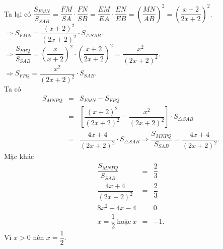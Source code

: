 \begin{ex}
{		Ta lại có  $\dfrac{S_{FMN}}{S_{SAB}}=\dfrac{FM}{S A} \cdot \dfrac{FN}{SB}=\dfrac{EM}{EA} \cdot \dfrac{EN}{EB}=\left(\dfrac{M N}{A B}\right)^{2}=\left(\dfrac{x+2}{2 x+2}\right)^{2}$.\\
		$\Rightarrow S_{FMN}=\dfrac{(x+2)^{2}}{(2 x+2)^{2}} \cdot S_{\triangle SAB}$.  \\
		$ \Rightarrow \dfrac{S_{FPQ}}{S_{SAB}}=\left(\dfrac{x}{x+2}\right)^{2}\cdot\left(\dfrac{x+2}{2x+2}\right)^{2}=\dfrac{x^{2}}{(2  x+2)^{2}}$.\\
		 $\Rightarrow S_{FPQ}=\dfrac{x^2}{(2x+2)^{2}} \cdot S_{SAB}$.\\
		Ta  có
		\begin{eqnarray*}
			S_{M N P  Q}&=&S_{FMN}-S_{FPQ}\\
			&=&\left[\dfrac{(x+2)^2}{(2x+2)^{2}}-\dfrac{x^2}{(2x+2)^{2}}\right] \cdot S_{\triangle SAB}\\ 
			&=&\dfrac{4x+4}{(2x+2)^2} \cdot  S_{\triangle SAB} \Rightarrow \dfrac{S_{MNPQ}}{S_{SAB}}=\dfrac{4x+4}{(2x+2)^2}.
		\end{eqnarray*}
		 Mặc khác
		\begin{eqnarray*}
			\dfrac{S_{MNPQ}}{S_{SAB}}&=&\dfrac{2}{3}\\  \dfrac{4x+4}{(2 x+2)^{2}}&=&\dfrac{2}{3}\\
			 8x^2+4x-4&=&0\\
			x=\dfrac{1}{2}\  \text{hoặc}\ x&=&-1.
		\end{eqnarray*}
		Vì $x>0$ nên  $x=\dfrac{1}{2}$.
	 }
\end{ex}

